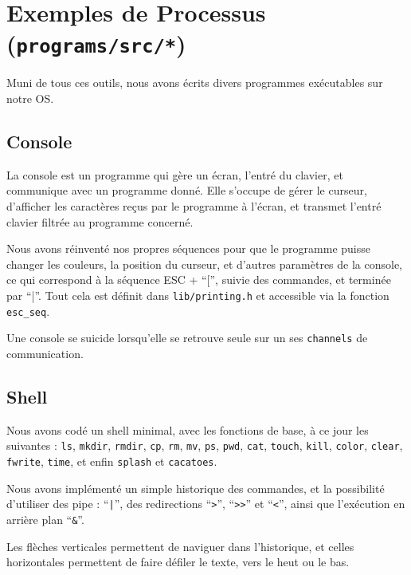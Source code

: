 \documentclass[a4paper,10pt, french]{article}
\newcommand{\code}[1]{\texttt{#1}}
\begin{document}
\section{Exemples de Processus (\code{programs/src/*})}

Muni de tous ces outils, nous avons écrits divers programmes exécutables sur notre OS.

\subsection{Console}
La console est un programme qui gère un écran, l'entré du clavier, et communique avec un programme donné.
Elle s'occupe de gérer le curseur, d'afficher les caractères reçus par le programme à l'écran, et transmet 
l'entré clavier filtrée au programme concerné.

Nous avons réinventé nos propres séquences pour que le programme puisse changer les couleurs, la position du curseur,
et d'autres paramètres de la console, ce qui correspond à la séquence ESC + ``['', suivie des commandes, et terminée par ``|''.
Tout cela est définit dans \code{lib/printing.h} et accessible via la fonction \code{esc\_seq}.

Une console se suicide lorsqu'elle se retrouve seule sur un ses \code{channels} de communication.

\subsection{Shell}
Nous avons codé un shell minimal, avec les fonctions de base, à ce jour les suivantes : \code{ls},
\code{mkdir}, \code{rmdir}, \code{cp}, \code{rm}, \code{mv}, \code{ps}, \code{pwd}, \code{cat},
\code{touch}, \code{kill}, \code{color}, \code{clear}, \code{fwrite}, 
\code{time}, et enfin \code{splash} et \code{cacatoes}.

Nous avons implémenté un simple historique des commandes, et la possibilité d'utiliser des pipe : ``\code{|}'',
des redirections ``\code{>}'', ``\code{>>}'' et ``\code{<}'', ainsi que l'exécution en arrière 
plan ``\code{\&}''.

Les flèches verticales permettent de naviguer dans l'historique, et celles horizontales permettent
de faire défiler le texte, vers le heut ou le bas.
\end{document}
